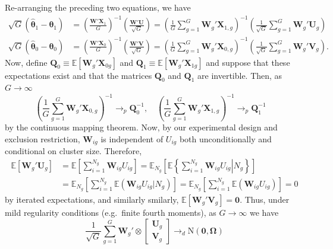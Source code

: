 Re-arranging the preceding two equations, we have
\begin{align*}
\sqrt{G} \left(\widehat{\boldsymbol{\theta}}_1  - \boldsymbol{\theta}_1\right) &= 
 \left(\frac{\mathbf{W}'\mathbf{X}_1}{G}\right)^{-1}\left(\frac{\mathbf{W}'\mathbf{U}}{\sqrt{G}}\right) = \left( \frac{1}{G} \sum_{g=1}^G \mathbf{W}_g' \mathbf{X}_{1,g}\right)^{-1}\left(\frac{1}{\sqrt{G}} \sum_{g=1}^G\mathbf{W}_g' \mathbf{U}_g\right) \\ 
\sqrt{G} \left(\widehat{\boldsymbol{\theta}}_0  - \boldsymbol{\theta}_0\right) &= 
 \left(\frac{\mathbf{W}'\mathbf{X}_0}{G}\right)^{-1}\left(\frac{\mathbf{W}'\mathbf{V}}{\sqrt{G}}\right) = \left( \frac{1}{G} \sum_{g=1}^G \mathbf{W}_g' \mathbf{X}_{0,g}\right)^{-1}\left(\frac{1}{\sqrt{G}} \sum_{g=1}^G\mathbf{W}_g' \mathbf{V}_g\right).
\end{align*}
Now, define $\mathbf{Q}_0 \equiv \mathbb{E}[\mathbf{W}_g'\mathbf{X}_{0g}]$ and $\mathbf{Q}_1 \equiv \mathbb{E}[\mathbf{W}_g'\mathbf{X}_{1g}]$ and suppose that these expectations exist and that the matrices $\mathbf{Q}_0$ and $\mathbf{Q}_1$ are invertible. Then, as $G \rightarrow \infty$
\[
 \left( \frac{1}{G} \sum_{g=1}^G \mathbf{W}_g' \mathbf{X}_{0,g}\right)^{-1} \rightarrow_p \mathbf{Q}_0^{-1}, \quad
 \left( \frac{1}{G} \sum_{g=1}^G \mathbf{W}_g' \mathbf{X}_{1,g}\right)^{-1} \rightarrow_p \mathbf{Q}_1^{-1} \quad
\]
by the continuous mapping theorem.
Now, by our experimental design and exclusion restriction, $\mathbf{W}_{ig}$ is independent of $U_{ig}$ both unconditionally and conditional on cluster size. 
Therefore,
\begin{align*}
\mathbb{E}[\mathbf{W}_g' \mathbf{U}_g] &=  \mathbb{E}\left[ \sum_{i=1}^{N_g} \mathbf{W}_{ig} U_{ig} \right] = \mathbb{E}_{N_g}\left[ \mathbb{E}\left\{\left. \sum_{i=1}^{N_g} \mathbf{W}_{ig} U_{ig} \right| N_g \right\}\right]\\
&= \mathbb{E}_{N_g}\left[ \sum_{i=1}^{N_g} \mathbb{E}(\mathbf{W}_{ig} U_{ig}|N_g)\right] = \mathbb{E}_{N_g}\left[ \sum_{i=1}^{N_g} \mathbb{E}(\mathbf{W}_{ig}U_{ig})\right] = 0
\end{align*}
by iterated expectations, and similarly smilarly, $\mathbb{E}[\mathbf{W}_g'\mathbf{V}_g] = \mathbf{0}$. 
Thus, under mild regularity conditions (e.g.\ finite fourth moments), as $G \rightarrow \infty$  we have
\[
\frac{1}{\sqrt{G}} \sum_{g=1}^G \mathbf{W}_g' \otimes \begin{bmatrix} \mathbf{U}_g \\ \mathbf{V}_g \end{bmatrix} \rightarrow_d \text{N}(\mathbf{0}, \boldsymbol{\Omega})
\]
